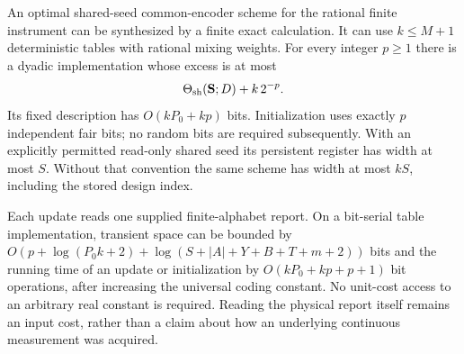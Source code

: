 \begin{theorem}
\label{thm:v9-compiler}
An optimal shared-seed common-encoder scheme for the rational finite
instrument can be synthesized by a finite exact calculation. It can use
$k\le M+1$ deterministic tables with rational mixing weights. For every
integer $p\ge1$ there is a dyadic implementation whose excess is at most
\begin{equation}
                  \Theta_{\rm sh}({\bf S};D)+k\,2^{-p}.
 \label{eq:v9-compileerror}
\end{equation}
Its fixed description has $O(kP_0+kp)$ bits. Initialization uses exactly
$p$ independent fair bits; no random bits are required subsequently.
With an explicitly permitted read-only shared seed its persistent
register has width at most $S$. Without that convention the same scheme
has width at most $kS$, including the stored design index.

Each update reads one supplied finite-alphabet report. On a bit-serial
table implementation, transient space can be bounded by
$O(p+\log(P_0k+2)+\log(S+|A|+Y+B+T+m+2))$ bits and the running time of
an update or initialization by $O(kP_0+kp+p+1)$ bit operations, after
increasing the universal coding constant. No unit-cost access to an
arbitrary real constant is required. Reading the physical report itself
remains an input cost, rather than a claim about how an underlying
continuous measurement was acquired.
\end{theorem}
